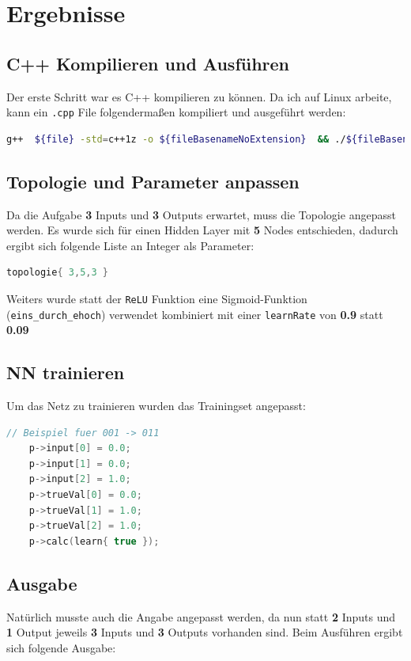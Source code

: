 
\section{Ergebnisse}
\label{sec:Ergebnisse}
\subsection{C++ Kompilieren und Ausführen}
Der erste Schritt war es C++ kompilieren zu können. Da ich auf Linux arbeite, kann ein \verb|.cpp| File folgendermaßen kompiliert und ausgeführt werden:

\begin{lstlisting}[language=bash]
g++  ${file} -std=c++1z -o ${fileBasenameNoExtension}  && ./${fileBasenameNoExtension}
\end{lstlisting}

\subsection{Topologie und Parameter anpassen}
Da die Aufgabe \textbf{3} Inputs und \textbf{3} Outputs erwartet, muss die Topologie angepasst werden. Es wurde sich für einen Hidden Layer mit \textbf{5} Nodes entschieden, dadurch ergibt sich folgende Liste an Integer als Parameter:

\begin{lstlisting}[language=c]
	topologie{ 3,5,3 }
\end{lstlisting}

Weiters wurde statt der \verb|ReLU| Funktion eine Sigmoid-Funktion (\verb|eins_durch_ehoch|) verwendet kombiniert mit einer \verb|learnRate| von \textbf{0.9} statt \textbf{0.09} 
\subsection{NN trainieren}
Um das Netz zu trainieren wurden das Trainingset angepasst:

\begin{lstlisting}[language=c]
	// Beispiel fuer 001 -> 011
	p->input[0] = 0.0;
	p->input[1] = 0.0;
	p->input[2] = 1.0;
	p->trueVal[0] = 0.0;
	p->trueVal[1] = 1.0;
	p->trueVal[2] = 1.0;
	p->calc(learn{ true });
\end{lstlisting}
\clearpage
\subsection{Ausgabe}
Natürlich musste auch die Angabe angepasst werden, da nun statt \textbf{2} Inputs und \textbf{1} Output jeweils \textbf{3} Inputs und \textbf{3} Outputs vorhanden sind. Beim Ausführen ergibt sich folgende Ausgabe:

